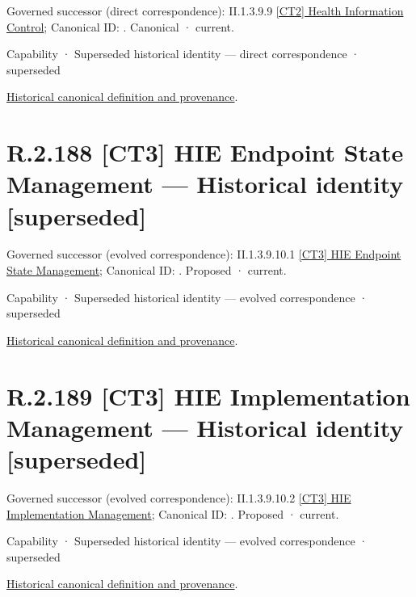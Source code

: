{\small Governed successor (direct correspondence): II.1.3.9.9 \hyperref[element:44cc0e17ad534675bf26dce6e46a68ff]{[CT2] Health Information Control}; Canonical ID: \texttt{}. Canonical · current.}\par
\label{element:a3196aef21d443519de874c24f64a185}
{\small Capability · Superseded historical identity — direct correspondence · superseded}\par
\href{../../../../continuum/strategy/capability/a3196aef21d443519de874c24f64a185.md}{Historical canonical definition and provenance}.\par
\section*{R.2.188 [CT3] HIE Endpoint State Management — Historical identity [superseded]}
\label{navigation:R.2.188}

{\small Governed successor (evolved correspondence): II.1.3.9.10.1 \hyperref[element:1bec951a1c98450b8d4672c5c424f9bd]{[CT3] HIE Endpoint State Management}; Canonical ID: \texttt{}. Proposed · current.}\par
\label{element:697de08ac49a4b7f8df7a1ed6f04210e}
{\small Capability · Superseded historical identity — evolved correspondence · superseded}\par
\href{../../../../continuum/strategy/capability/697de08ac49a4b7f8df7a1ed6f04210e.md}{Historical canonical definition and provenance}.\par
\section*{R.2.189 [CT3] HIE Implementation Management — Historical identity [superseded]}
\label{navigation:R.2.189}

{\small Governed successor (evolved correspondence): II.1.3.9.10.2 \hyperref[element:8ce29be373e04252b7aa881b6a72f375]{[CT3] HIE Implementation Management}; Canonical ID: \texttt{}. Proposed · current.}\par
\label{element:a99b4119339545a89dc54ebb216ddb85}
{\small Capability · Superseded historical identity — evolved correspondence · superseded}\par
\href{../../../../continuum/strategy/capability/a99b4119339545a89dc54ebb216ddb85.md}{Historical canonical definition and provenance}.\par
